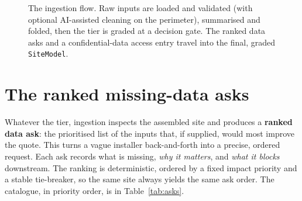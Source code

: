 \begin{figure}[H]
{}
\caption{The ingestion flow. Raw inputs are loaded and validated (with optional AI-assisted cleaning on the perimeter), summarised and folded, then the tier is graded at a decision gate. The ranked data asks and a confidential-data access entry travel into the final, graded \texttt{SiteModel}.}
\label{fig:ingestion-flow}
\end{figure}

\section{The ranked missing-data asks}

Whatever the tier, ingestion inspects the assembled site and produces a \textbf{ranked data ask}: the prioritised list of the inputs that, if supplied, would most improve the quote. This turns a vague installer back-and-forth into a precise, ordered request. Each ask records what is missing, \emph{why it matters}, and \emph{what it blocks} downstream. The ranking is deterministic, ordered by a fixed impact priority and a stable tie-breaker, so the same site always yields the same ask order. The catalogue, in priority order, is in Table~\ref{tab:asks}.

